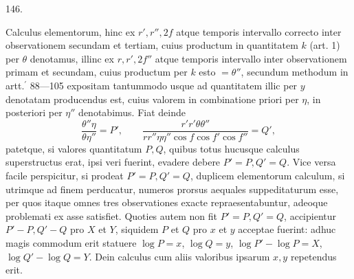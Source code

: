\par{}\medskip
\begin{center}\hypertarget{native-196-article146}{}146.\end{center}
Calculus elementorum, hinc ex $r',r'',2f$ atque temporis intervallo correcto
inter observationem secundam et tertiam, cuius productum in quantitatem $k$
(art. 1) per $\theta$ denotamus, illinc ex $r,r',2f''$ atque temporis intervallo inter observationem
primam et secundam, cuius productum per $k$ esto $=\theta''$, secundum
methodum in artt.$^{\prime}$ 88—105 expositam tantummodo usque ad quantitatem illic
per $y$ denotatam producendus est, cuius valorem in combinatione priori per $\eta$,
in posteriori per $\eta''$ denotabimus. Fiat deinde
\[
\frac{\theta''\eta}{\theta\eta''}=P',\qquad
\frac{r'r'\theta\theta''}{rr''\eta\eta''\cos f\cos f'\cos f''}=Q',
\]
patetque, si valores quantitatum $P,Q$, quibus totus hucusque calculus superstructus
erat, ipsi veri fuerint, evadere debere $P'=P,Q'=Q$. Vice versa
facile perspicitur, si prodeat $P'=P,Q'=Q$, duplicem elementorum calculum,
si utrimque ad finem perducatur, numeros prorsus aequales suppeditaturum
esse, per quos itaque omnes tres observationes exacte repraesentabuntur, adeoque
problemati ex asse satisfiet. Quoties autem non fit $P'=P,Q'=Q$, accipientur
$P'-P,Q'-Q$ pro $X$ et $Y$, siquidem $P$ et $Q$ pro $x$ et $y$ acceptae fuerint:
adhuc magis commodum erit statuere $\log P=x$, $\log Q=y$, $\log P'-\log P=X$, $\log Q'-\log Q=Y$.
Dein calculus cum aliis valoribus ipsarum $x,y$ repetendus erit.
